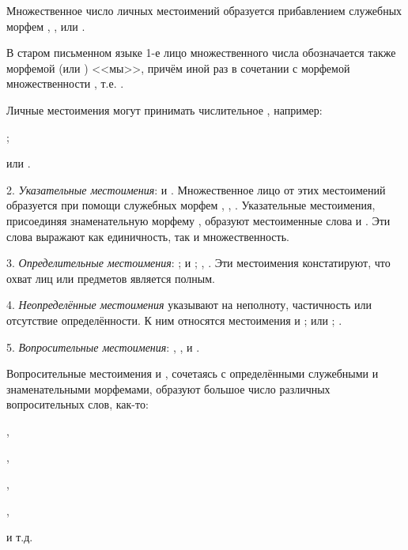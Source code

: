 Множественное число личных местоимений образуется прибавлением служебных морфем , ,  или .

В старом письменном языке 1-е лицо множественного числа обозначается также морфемой	 (или ) <<мы>>, причём иной раз в сочетании с морфемой множественности , т.е. .

Личные местоимения могут принимать числительное , например:
\begin{prfsample}
    \item {};
    \item {} или .
\end{prfsample}

2. \emph{Указательные местоимения}:	 и . Множественное лицо от этих местоимений образуется при помощи служебных морфем , , . Указательные местоимения, присоединяя знаменательную морфему , образуют местоименные слова  и . Эти слова выражают как единичность, так и множественность.

3. \emph{Определительные местоимения}: ;  и ; , . Эти местоимения констатируют, что охват лиц или предметов является полным.

4. \emph{Неопределённые местоимения} указывают на неполноту, частичность или отсутствие определённости. К ним относятся местоимения  и ;  или ; .

5. \emph{Вопросительные местоимения}:
, ,  и .

Вопросительные местоимения  и , сочетаясь с определёнными служебными и знаменательными морфемами, образуют большое число различных вопросительных слов, как-то:
\begin{prfsample}
    \item {},
    \item {},
    \item {},
    \item {},
    \item {}
\end{prfsample}
и т.д.

